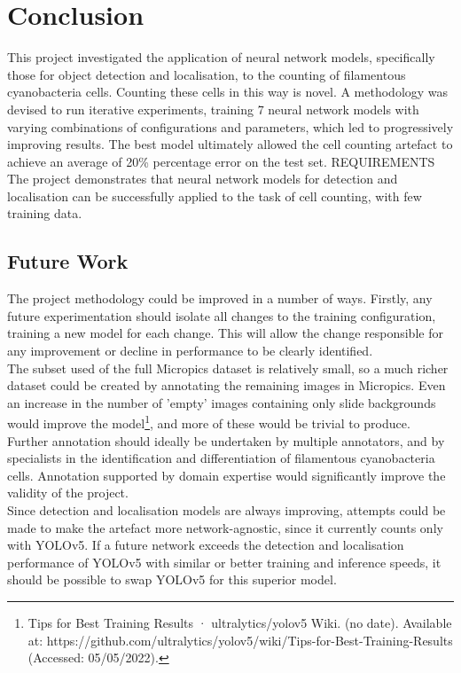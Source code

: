
\chapter{Conclusion}
This project investigated the application of neural network models, specifically those for object detection and localisation, to the counting of filamentous cyanobacteria cells. Counting these cells in this way is novel. A methodology was devised to run iterative experiments, training 7 neural network models with varying combinations of configurations and parameters, which led to progressively improving results. The best model ultimately allowed the cell counting artefact to achieve an average of 20\% percentage error on the test set. REQUIREMENTS\\

The project demonstrates that neural network models for detection and localisation can be successfully applied to the task of cell counting, with few training data.

\section{Future Work}
The project methodology⁠ could be improved in a number of ways. Firstly, any future experimentation should isolate all changes to the training configuration, training a new model for each change. This will allow the change responsible for any improvement or decline in performance to be clearly identified.\\

The subset used of the full Micropics dataset is relatively small, so a much richer dataset could be created by annotating the remaining images in Micropics. Even an increase in the number of 'empty' images containing only slide backgrounds would improve the model\footnote{Tips for Best Training Results · ultralytics/yolov5 Wiki. (no date). Available at: https://github.com/ultralytics/yolov5/wiki/Tips-for-Best-Training-Results (Accessed: 05/05/2022).}, and more of these would be trivial to produce. Further annotation should ideally be undertaken by multiple annotators, and by specialists in the identification and differentiation of filamentous cyanobacteria cells. Annotation supported by domain expertise would significantly improve the validity of the project.\\

Since detection and localisation models are always improving, attempts could be made to make the artefact more network-agnostic, since it currently counts only with YOLOv5. If a future network exceeds the detection and localisation performance of YOLOv5 with similar or better training and inference speeds, it should be possible to swap YOLOv5 for this superior model.\\



